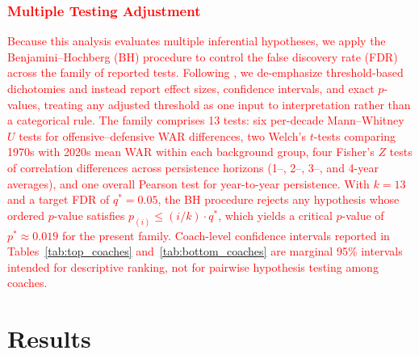 \documentclass[USenglish]{article}
\newcommand{\rev}[1]{\textcolor{red}{#1}}
\theoremstyle{dgthm}
\theoremstyle{dgdef}
\begin{document}
\rev{\subsubsection{Multiple Testing Adjustment}\label{sec:multiple_testing}}

\rev{Because this analysis evaluates multiple inferential hypotheses, we apply the Benjamini--Hochberg (BH) procedure \citep{benjamini1995} to control the false discovery rate (FDR) across the family of reported tests. Following \citet{wasserstein2016}, we de-emphasize threshold-based dichotomies and instead report effect sizes, confidence intervals, and exact $p$-values, treating any adjusted threshold as one input to interpretation rather than a categorical rule. The family comprises 13 tests: six per-decade Mann--Whitney $U$ tests for offensive--defensive WAR differences, two Welch's $t$-tests comparing 1970s with 2020s mean WAR within each background group, four Fisher's $Z$ tests of correlation differences across persistence horizons (1--, 2--, 3--, and 4-year averages), and one overall Pearson test for year-to-year persistence. With $k = 13$ and a target FDR of $q^* = 0.05$, the BH procedure rejects any hypothesis whose ordered $p$-value satisfies $p_{(i)} \leq (i/k) \cdot q^*$, which yields a critical $p$-value of $p^* \approx 0.019$ for the present family. Coach-level confidence intervals reported in Tables~\ref{tab:top_coaches} and~\ref{tab:bottom_coaches} are marginal 95\% intervals intended for descriptive ranking, not for pairwise hypothesis testing among coaches.}
\par\bigskip

\section{Results}
\end{document}
